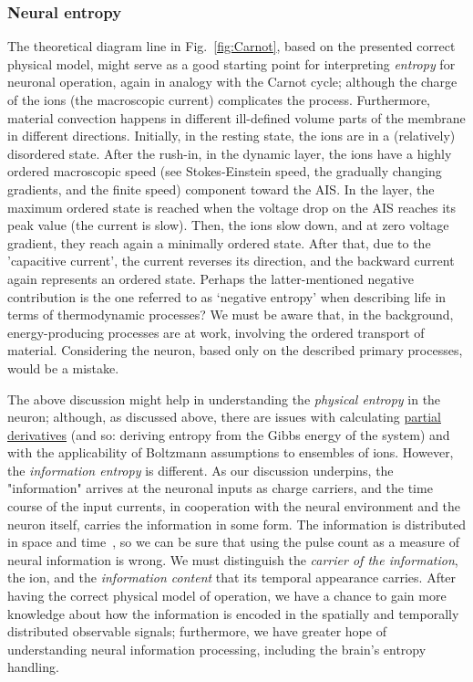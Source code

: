 \subsubsection{Neural entropy\label{sec:HeatEntropy}}
The theoretical diagram line in Fig.~\ref{fig:Carnot}, based on the presented correct physical model, might serve as a good starting point for interpreting \textit{entropy} for neuronal operation, again in analogy with the Carnot cycle; although the charge of the ions (the macroscopic current) complicates the process. Furthermore, material convection happens in
different ill-defined volume parts of the membrane in different directions. Initially, in the resting state, the ions are in a (relatively) disordered state. After the rush-in, in the dynamic layer, the ions have a highly ordered macroscopic speed (see Stokes-Einstein speed, the gradually changing gradients, and the finite speed) component toward the \gls{AIS}. In the layer, the maximum ordered state is reached when the voltage drop on the \gls{AIS} reaches its peak value (the current is slow). Then, the ions slow down, and at zero voltage gradient, they reach again a minimally ordered state. After that, due to the 'capacitive current', the current reverses its direction, and the backward current again represents an ordered state.  
Perhaps the latter-mentioned negative contribution is the one referred to as ‘negative entropy’ when describing life in terms of thermodynamic processes? We must be aware that, in the background, energy-producing processes are at work, involving the ordered transport of material. Considering the neuron, based only on the described primary processes, would be a mistake.

The above discussion might help in understanding the \textit{physical entropy}
in the neuron; although, as discussed above, there are issues with calculating \hyperlink{PartialDerivative}{partial derivatives} (and so: deriving entropy from the Gibbs energy of the system) and with the applicability of Boltzmann assumptions to ensembles of ions. However, the \textit{information entropy} is different. 
As our discussion underpins, the "information" arrives at the neuronal inputs as charge carriers, and the time course of the input currents, in cooperation with the neural environment and the neuron itself, carries the information in some form. 
The information is distributed in space and time~\cite{VeghNeuralShannon:2022, VeghChannelCapacity:2023}, so we can be sure that using the pulse count as a measure of neural information is wrong. We must distinguish the \textit{carrier of the information}, the ion, and the \textit{information content} that its temporal appearance carries. After having the correct physical model of operation, we have a chance to gain more knowledge about how the
information is encoded in the spatially and temporally distributed
observable signals; furthermore, we have greater hope of understanding neural information processing, including the brain's entropy handling.
